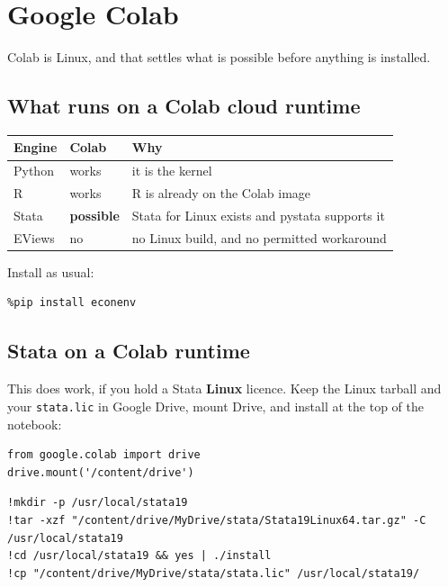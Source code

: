 \documentclass[11pt,a4paper]{report}
\begin{document}
\chapter{Google Colab}

Colab is Linux, and that settles what is possible before anything is installed.

\section{What runs on a Colab cloud runtime}

\begin{center}
\begin{tabular}{@{}llp{7.4cm}@{}}
\toprule
\textbf{Engine} & \textbf{Colab} & \textbf{Why} \\
\midrule
Python & works & it is the kernel \\
R & works & R is already on the Colab image \\
Stata & \textbf{possible} & Stata for Linux exists and pystata supports it \\
EViews & no & no Linux build, and no permitted workaround \\
\bottomrule
\end{tabular}
\end{center}

Install as usual:

\begin{lstlisting}
%pip install econenv
\end{lstlisting}

\section{Stata on a Colab runtime}

This does work, if you hold a Stata \textbf{Linux} licence. Keep the Linux
tarball and your \texttt{stata.lic} in Google Drive, mount Drive, and install at
the top of the notebook:

\begin{lstlisting}
from google.colab import drive
drive.mount('/content/drive')
\end{lstlisting}

\begin{lstlisting}
!mkdir -p /usr/local/stata19
!tar -xzf "/content/drive/MyDrive/stata/Stata19Linux64.tar.gz" -C /usr/local/stata19
!cd /usr/local/stata19 && yes | ./install
!cp "/content/drive/MyDrive/stata/stata.lic" /usr/local/stata19/
\end{lstlisting}
\end{document}
